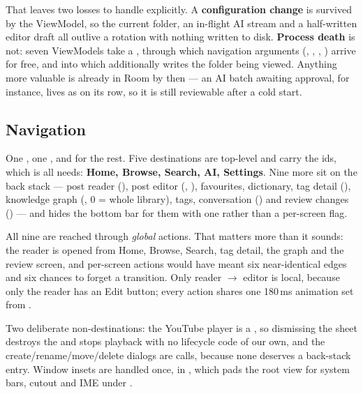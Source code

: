 That leaves two losses to handle explicitly. A \textbf{configuration change} is survived by the
ViewModel, so the current folder, an in-flight AI stream and a half-written editor draft all outlive
a rotation with nothing written to disk. \textbf{Process death} is not: seven ViewModels take a
, through which navigation arguments (, ,
, ) arrive for free, and into which 
additionally writes the folder being viewed. Anything more valuable is already in Room by then --- an
AI batch awaiting approval, for instance, lives as  on its 
row, so it is still reviewable after a cold start.

\subsection{Navigation}

One , one , and  for the rest. Five
destinations are top-level and carry the  ids, which is all
 needs: \textbf{Home, Browse, Search, AI, Settings}. Nine more sit on
the back stack --- post reader (), post editor (, ),
favourites, dictionary, tag detail (), knowledge graph (, 0 = whole
library), tags, conversation () and review changes () ---
and  hides the bottom bar for them with one
 rather than a per-screen flag.



All nine are reached through \emph{global} actions. That matters more than it sounds: the reader is
opened from Home, Browse, Search, tag detail, the graph and the review screen, and per-screen actions
would have meant six near-identical edges and six chances to forget a transition. Only reader
$\rightarrow$ editor is local, because only the reader has an Edit button; every action shares one
180\,ms animation set from .

Two deliberate non-destinations: the YouTube player is a , so
dismissing the sheet destroys the  and stops playback with no lifecycle code of our
own, and the create/rename/move/delete dialogs are  calls, because
none deserves a back-stack entry. Window insets are handled once, in , which pads
the root view for system bars, cutout and IME under .

